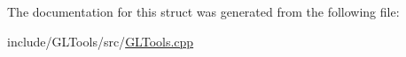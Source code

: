 The documentation for this struct was generated from the following file\-:\begin{DoxyCompactItemize}
\item 
include/\-G\-L\-Tools/src/\hyperlink{_g_l_tools_8cpp}{G\-L\-Tools.\-cpp}\end{DoxyCompactItemize}
